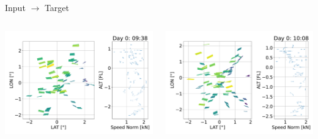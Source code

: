 \documentclass[aspectratio=169]{beamer}
\begin{document}
\begin{frame}{ Input $\rightarrow$ Target}
    \begin{columns}[T]
        \begin{column}{0.5\textwidth}
            \centering
            \includegraphics[height=0.6\textheight]{imgs/windslice-531}
        \end{column}
        \begin{column}{0.5\textwidth}
            \centering
            \includegraphics[height=0.6\textheight]{imgs/windslice-561}
        \end{column}
    \end{columns}
\end{frame}
\end{document}
